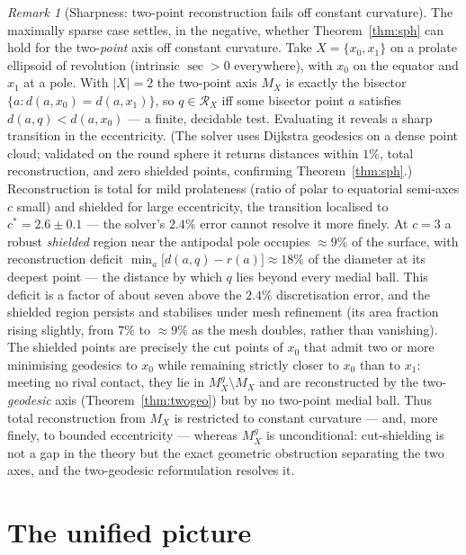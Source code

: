 \documentclass[11pt]{article}
\theoremstyle{remark}
\newtheorem{remark}[theorem]{Remark}
\newcommand{\X}{X}
\newcommand{\Mx}{M_{\X}}
\newcommand{\Rx}{\mathcal{R}_{\X}}
\newcommand{\sect}{\operatorname{sec}}
\begin{document}
\begin{remark}[Sharpness: two-point reconstruction fails off constant
curvature]\label{rem:sharp}
The maximally sparse case settles, in the negative, whether
Theorem~\ref{thm:sph} can hold for the two-\emph{point} axis off constant
curvature. Take $\X=\{x_{0},x_{1}\}$ on a prolate ellipsoid of revolution
(intrinsic $\sect>0$ everywhere), with $x_{0}$ on the equator and $x_{1}$
at a pole. With $|\X|=2$ the two-point axis $\Mx$ is exactly the bisector
$\{a:d(a,x_{0})=d(a,x_{1})\}$, so $q\in\Rx$ iff some bisector point $a$
satisfies $d(a,q)<d(a,x_{0})$ --- a finite, decidable test. Evaluating it
reveals a sharp transition in the eccentricity. (The solver uses Dijkstra
geodesics on a dense point cloud; validated on the round sphere it returns
distances within $1\%$, total reconstruction, and zero shielded points,
confirming Theorem~\ref{thm:sph}.) Reconstruction is total for mild prolateness (ratio of
polar to equatorial semi-axes $c$ small) and shielded for large
eccentricity, the transition localised to $c^{\ast}=2.6\pm0.1$ --- the
solver's $2.4\%$ error cannot resolve it more finely. At $c=3$ a robust
\emph{shielded} region near the antipodal pole occupies $\approx9\%$ of the
surface, with reconstruction deficit
$\min_{a}\bigl[d(a,q)-r(a)\bigr]\approx18\%$ of the diameter at its deepest
point --- the distance by which $q$ lies beyond every medial ball. This
deficit is a factor of about seven above the $2.4\%$ discretisation error,
and the shielded region persists and stabilises under
mesh refinement (its area fraction rising slightly, from $7\%$ to
$\approx9\%$ as the mesh doubles, rather than vanishing). The shielded
points are precisely the cut points of $x_{0}$ that admit two or more
minimising geodesics to $x_{0}$ while remaining strictly closer to $x_{0}$
than to $x_{1}$: meeting no rival contact, they lie in
$\Mx^{g}\setminus\Mx$ and are reconstructed by the two-\emph{geodesic} axis
(Theorem~\ref{thm:twogeo}) but by no two-point medial ball. Thus total
reconstruction from $\Mx$ is restricted to constant curvature --- and, more
finely, to bounded eccentricity --- whereas $\Mx^{g}$ is unconditional:
cut-shielding is not a gap in the theory but the exact geometric
obstruction separating the two axes, and the two-geodesic reformulation
resolves it.
\end{remark}

\section{The unified picture}\label{sec:disc}
\end{document}
